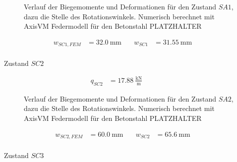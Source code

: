 \documentclass[
  11pt,
  letterpaper,
]{scrreprt}
\makeatletter
\let\oldparagraph\paragraph
\renewcommand{\paragraph}{
    \@ifstar
      \xxxParagraphStar
      \xxxParagraphNoStar
  }
\newcommand{\xxxParagraphStar}[1]{\oldparagraph*{#1}\mbox{}}
\newcommand{\xxxParagraphNoStar}[1]{\oldparagraph{#1}\mbox{}}
\makeatother
\begin{document}
\begin{figure}[H]


\caption{\label{fig-jag_feder_my_SC1}Verlauf der Biegemomente und
Deformationen für den Zustand \(SA1\), dazu die Stelle des
Rotationswinkels. Numerisch berechnet mit AxisVM Federmodell für den
Betonstahl PLATZHALTER}

\end{figure}%

\[
\begin{aligned}
w_{SC1 , FEM}& = 32.0 \ \mathrm{mm} \quad & w_{SC1}& = 31.55 \ \mathrm{mm} \quad &  
 \end{aligned}
\]

\paragraph{\texorpdfstring{Zustand
\(SC2\)}{Zustand SC2}}\label{zustand-sc2}

\[
\begin{aligned}
q_{SC2}& = 17.88 \ \frac{\mathrm{kN}}{\mathrm{m}} \quad &  \quad &  
 \end{aligned}
\]

\begin{figure}[H]


\caption{\label{fig-jag_feder_my_SC2}Verlauf der Biegemomente und
Deformationen für den Zustand \(SA2\), dazu die Stelle des
Rotationswinkels. Numerisch berechnet mit AxisVM Federmodell für den
Betonstahl PLATZHALTER}

\end{figure}%

\[
\begin{aligned}
w_{SC2 , FEM}& = 60.0 \ \mathrm{mm} \quad & w_{SC2}& = 65.6 \ \mathrm{mm} \quad &  
 \end{aligned}
\]

\paragraph{\texorpdfstring{Zustand
\(SC3\)}{Zustand SC3}}\label{zustand-sc3}
\end{document}
